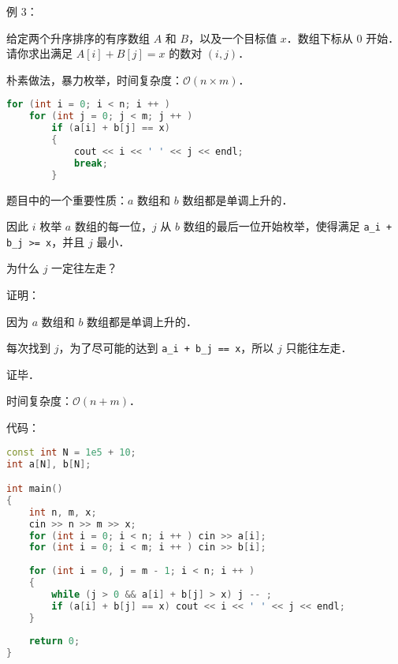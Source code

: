 例 $3$：

给定两个升序排序的有序数组 $A$ 和 $B$，以及一个目标值 $x$．数组下标从 $0$ 开始．请你求出满足 $A[i] + B[j] = x$ 的数对 $(i, j)$．

朴素做法，暴力枚举，时间复杂度：$\mathcal{O}(n \times m)$．

\begin{lstlisting}[language=cpp]
for (int i = 0; i < n; i ++ )   
    for (int j = 0; j < m; j ++ )
        if (a[i] + b[j] == x)
        {
            cout << i << ' ' << j << endl; 
            break;
        }
\end{lstlisting}

题目中的一个重要性质：$a$ 数组和 $b$ 数组都是单调上升的．

因此 $i$ 枚举 $a$ 数组的每一位，$j$ 从 $b$ 数组的最后一位开始枚举，使得满足 \verb|a_i + b_j >= x|，并且 $j$ 最小．

为什么 $j$ 一定往左走？

证明：

因为 $a$ 数组和 $b$ 数组都是单调上升的．

每次找到 $j$，为了尽可能的达到 \verb|a_i + b_j == x|，所以 $j$ 只能往左走．

证毕．

时间复杂度：$\mathcal{O}(n + m)$．

代码：

\begin{lstlisting}[language=cpp]
const int N = 1e5 + 10;
int a[N], b[N];

int main()
{
    int n, m, x;
    cin >> n >> m >> x;
    for (int i = 0; i < n; i ++ ) cin >> a[i];
    for (int i = 0; i < m; i ++ ) cin >> b[i];
    
    for (int i = 0, j = m - 1; i < n; i ++ )
    {
        while (j > 0 && a[i] + b[j] > x) j -- ;
        if (a[i] + b[j] == x) cout << i << ' ' << j << endl;
    }
    
    return 0;
}
\end{lstlisting}